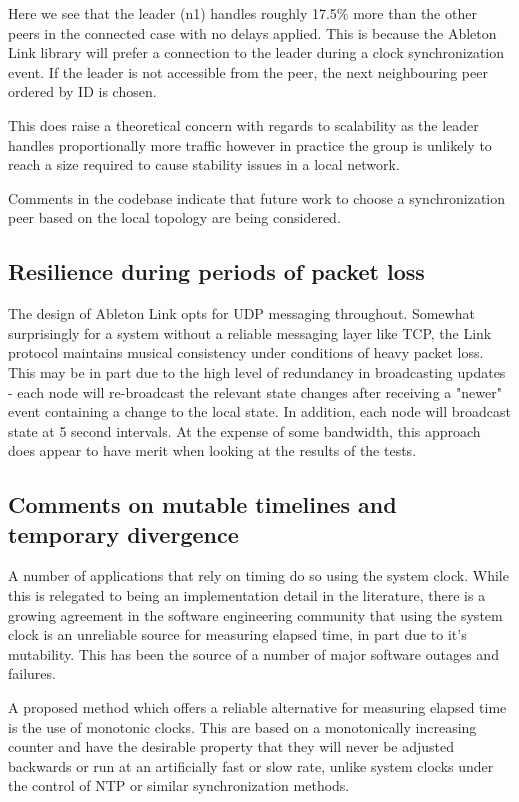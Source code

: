 \documentclass[11pt]{article} %
\theoremstyle{plain}
\theoremstyle{definition}
\begin{document}
Here we see that the leader (n1) handles roughly 17.5\% more than the other
peers in the connected case with no delays applied. This is because the Ableton
Link library will prefer a connection to the leader during a clock
synchronization event. If the leader is not accessible from the peer, the next
neighbouring peer ordered by ID is chosen.

This does raise a theoretical concern with regards to scalability as the leader
handles proportionally more traffic however in practice the group is unlikely
to reach a size required to cause stability issues in a local network.

Comments in the codebase indicate that future work to choose a synchronization
peer based on the local topology are being considered.

\subsection{Resilience during periods of packet loss}

The design of Ableton Link opts for UDP messaging throughout. Somewhat
surprisingly for a system without a reliable messaging layer like TCP, the Link
protocol maintains musical consistency under conditions of heavy packet loss.
This may be in part due to the high level of redundancy in broadcasting updates
- each node will re-broadcast the relevant state changes after receiving a
"newer" event containing a change to the local state. In addition, each node
will broadcast state at 5 second intervals. At the expense of some bandwidth,
this approach does appear to have merit when looking at the results of the tests.

\subsection{Comments on mutable timelines and temporary divergence}

A number of applications that rely on timing do so using the system clock.
While this is relegated to being an implementation detail in the literature,
there is a growing agreement in the software engineering community that using
the system clock is an unreliable source for measuring elapsed time, in part
due to it's mutability. This has been the source of a number of major software
outages and failures\cite{monotonic}.

A proposed method which offers a reliable alternative for measuring elapsed
time is the use of monotonic clocks. This are based on a monotonically
increasing counter and have the desirable property that they will never be
adjusted backwards or run at an artificially fast or slow rate, unlike system
clocks under the control of NTP or similar synchronization methods.
\end{document}
